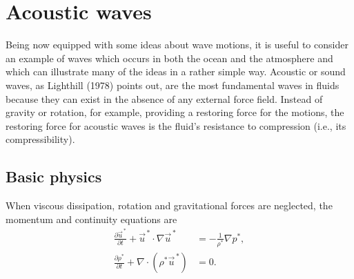 
\setcounter{chapter}{1}

\chapter{Acoustic waves}

Being now equipped with some ideas about wave motions, it is useful to consider an
example of waves which occurs in both the ocean and the atmosphere and which can
illustrate many of the ideas in a rather simple way. Acoustic or sound waves, as
Lighthill (1978) points out, are the most fundamental waves in fluids because they can
exist in the absence of any external force field. Instead of gravity or rotation, for
example, providing a restoring force for the motions, the restoring force for acoustic
waves is the fluid's resistance to compression (i.e., its compressibility).

\section{Basic physics}

When viscous dissipation, rotation and gravitational forces are neglected, the
momentum and continuity equations are
\begin{align*}
	\frac{\partial\vec u^{\,*}}{\partial t}
	+\vec u^{\,*}\cdot\nabla\vec u^{\,*}
	                                 & =-\frac{1}{\rho^*}\nabla p^*, \\
	\frac{\partial\rho^*}{\partial t}
	+\nabla\cdot(\rho^*\vec u^{\,*}) & =0.
\end{align*}

\sourcepagebreak

